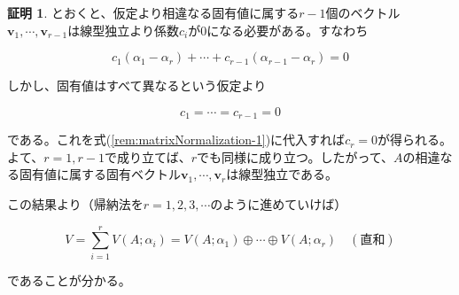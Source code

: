 \documentclass[dvipdfmx,autodetect-engine]{jsarticle}
\theoremstyle{definition}
\newtheorem*{Proof*}{証明}
\begin{document}
{\begin{Proof*}
とおくと、仮定より相違なる固有値に属する$r - 1$個のベクトル$\bm{v}_1, \cdots, \bm{v}_{r-1}$は線型独立より係数$c_i$が$0$になる必要がある。すなわち

$$
c_1(\alpha_1 - \alpha_r) + \cdots + c_{r-1}(\alpha_{r-1} - \alpha_r) = 0
$$

しかし、固有値はすべて異なるという仮定より

$$
c_1 = \cdots = c_{r-1} = 0
$$

である。これを式(\ref{rem:matrixNormalization-1})に代入すれば$c_r = 0$が得られる。よて、$r = 1, r - 1$で成り立てば、$r$でも同様に成り立つ。したがって、$A$の相違なる固有値に属する固有ベクトル$\bm{v}_1, \cdots, \bm{v}_r$は線型独立である。

この結果より（帰納法を$r = 1, 2, 3, \cdots$のように進めていけば）

$$
V = \sum_{i=1}^{r} V(A;\alpha_i) = V(A;\alpha_1) \oplus \cdots \oplus V(A;\alpha_r) \quad (直和)
$$

であることが分かる。
\end{Proof*}
}
\end{document}
